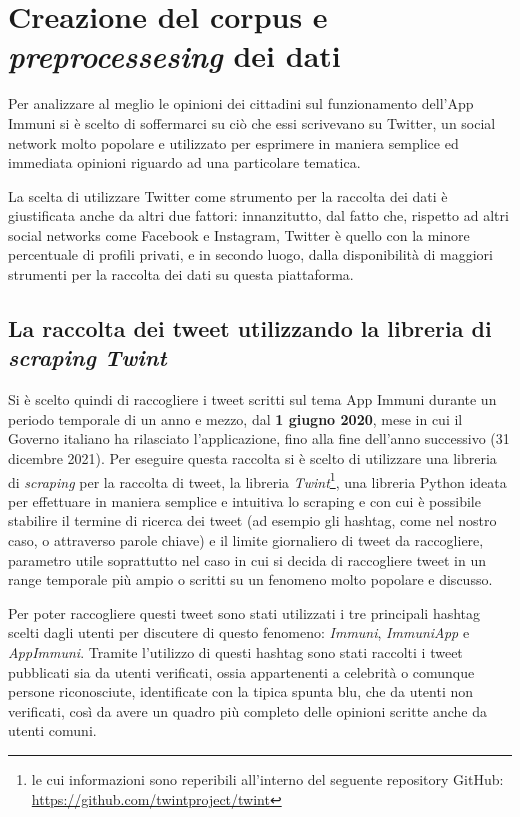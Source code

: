 \chapter{Creazione del corpus e \textit{preprocessesing} dei dati}
Per analizzare al meglio le opinioni dei cittadini sul funzionamento dell'App Immuni si è scelto di soffermarci su ciò che essi scrivevano su Twitter, un social network molto popolare e utilizzato per esprimere in maniera semplice ed immediata opinioni riguardo ad una particolare tematica.

La scelta di utilizzare Twitter come strumento per la raccolta dei dati è giustificata anche da altri due fattori: innanzitutto, dal fatto che, rispetto ad altri social networks come Facebook e Instagram, Twitter è quello con la minore percentuale di profili privati, e in secondo luogo, dalla disponibilità di maggiori strumenti per la raccolta dei dati su questa piattaforma.

\section{La raccolta dei tweet utilizzando la libreria di \textit{scraping Twint}}
Si è scelto quindi di raccogliere i tweet scritti sul tema App Immuni durante un periodo temporale di un anno e mezzo, dal \textbf{1 giugno 2020}, mese in cui il Governo italiano ha rilasciato l'applicazione, fino alla fine dell'anno successivo (31 dicembre 2021). 
Per eseguire questa raccolta si è scelto di utilizzare una libreria di \textit{scraping} per la raccolta di tweet, la libreria \textit{Twint}\footnote{le cui informazioni sono reperibili all'interno del seguente repository GitHub: \url{https://github.com/twintproject/twint}}, una libreria Python ideata per  effettuare in maniera semplice e intuitiva lo scraping e con cui è possibile stabilire il termine di ricerca dei tweet (ad esempio gli hashtag, come nel nostro caso, o attraverso parole chiave) e il limite giornaliero di tweet da raccogliere, parametro utile soprattutto nel caso in cui si decida di raccogliere tweet in un range temporale più ampio o scritti su un fenomeno molto popolare e discusso.

Per poter raccogliere questi tweet sono stati utilizzati i tre principali hashtag scelti dagli utenti per discutere di questo fenomeno: \textit{Immuni}, \textit{ImmuniApp} e \textit{AppImmuni}.
Tramite l'utilizzo di questi hashtag sono stati raccolti i tweet pubblicati sia da utenti verificati, ossia appartenenti a celebrità o comunque persone riconosciute, identificate con la tipica spunta blu, che da utenti non verificati, così da avere un quadro più completo delle opinioni scritte anche da utenti comuni.

